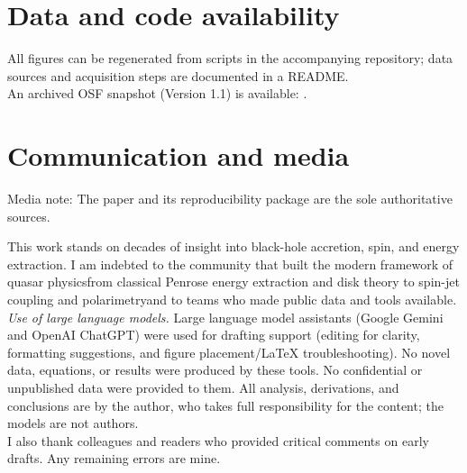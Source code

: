 \documentclass[twocolumn]{aastex701}
\begin{document}
\section*{Data and code availability}
All figures can be regenerated from scripts in the accompanying repository; data sources and acquisition steps are documented in a README.\\
An archived OSF snapshot (Version 1.1) is available: .
\section*{Communication and media}
Media note: The paper and its reproducibility package are the sole authoritative sources.

\begin{acknowledgments}
This work stands on decades of insight into black-hole accretion, spin, and energy extraction. I am indebted to the community that built the modern framework of quasar physics\textemdash{}from classical Penrose energy extraction and disk theory to spin-jet coupling and polarimetry\textemdash{}and to teams who made public data and tools available.
\\[2pt]
\textit{Use of large language models.} Large language model assistants (Google Gemini and OpenAI ChatGPT) were used for drafting support (editing for clarity, formatting suggestions, and figure placement/LaTeX troubleshooting). No novel data, equations, or results were produced by these tools. No confidential or unpublished data were provided to them. All analysis, derivations, and conclusions are by the author, who takes full responsibility for the content; the models are not authors.
\\[2pt]
I also thank colleagues and readers who provided critical comments on early drafts. Any remaining errors are mine.
\end{acknowledgments}


\nocite{*}


\end{document}
